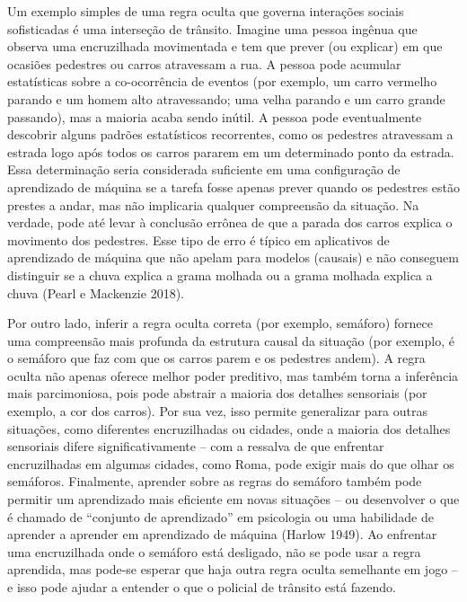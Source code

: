 \documentclass[
  12pt,
]{book}
\begin{document}
Um exemplo simples de uma regra oculta que governa interações sociais sofisticadas é uma interseção de trânsito. Imagine uma pessoa ingênua que observa uma encruzilhada movimentada e tem que prever (ou explicar) em que ocasiões pedestres ou carros atravessam a rua. A pessoa pode acumular estatísticas sobre a co-ocorrência de eventos (por exemplo, um carro vermelho parando e um homem alto atravessando; uma velha parando e um carro grande passando), mas a maioria acaba sendo inútil. A pessoa pode eventualmente descobrir alguns padrões estatísticos recorrentes, como os pedestres atravessam a estrada logo após todos os carros pararem em um determinado ponto da estrada. Essa determinação seria considerada suficiente em uma configuração de aprendizado de máquina se a tarefa fosse apenas prever quando os pedestres estão prestes a andar, mas não implicaria qualquer compreensão da situação. Na verdade, pode até levar à conclusão errônea de que a parada dos carros explica o movimento dos pedestres. Esse tipo de erro é típico em aplicativos de aprendizado de máquina que não apelam para modelos (causais) e não conseguem distinguir se a chuva explica a grama molhada ou a grama molhada explica a chuva (Pearl e Mackenzie 2018).

Por outro lado, inferir a regra oculta correta (por exemplo, semáforo) fornece uma compreensão mais profunda da estrutura causal da situação (por exemplo, é o semáforo que faz com que os carros parem e os pedestres andem). A regra oculta não apenas oferece melhor poder preditivo, mas também torna a inferência mais parcimoniosa, pois pode abstrair a maioria dos detalhes sensoriais (por exemplo, a cor dos carros). Por sua vez, isso permite generalizar para outras situações, como diferentes encruzilhadas ou cidades, onde a maioria dos detalhes sensoriais difere significativamente -- com a ressalva de que enfrentar encruzilhadas em algumas cidades, como Roma, pode exigir mais do que olhar os semáforos. Finalmente, aprender sobre as regras do semáforo também pode permitir um aprendizado mais eficiente em novas situações -- ou desenvolver o que é chamado de ``conjunto de aprendizado'' em psicologia ou uma habilidade de aprender a aprender em aprendizado de máquina (Harlow 1949). Ao enfrentar uma encruzilhada onde o semáforo está desligado, não se pode usar a regra aprendida, mas pode-se esperar que haja outra regra oculta semelhante em jogo -- e isso pode ajudar a entender o que o policial de trânsito está fazendo.
\end{document}
